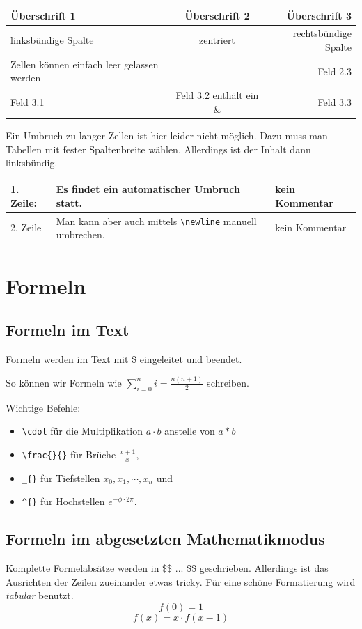 \documentclass[
	10pt,
	parskip=half-,		%
	paper=a4,			%
	english, ngerman		%
	]{scrartcl}			%
\begin{document}
\begin{tabular}[c]
	{|l|c|r|} %
	\hline %
	\textbf{Überschrift 1} & \textbf{Überschrift 2} & \textbf{Überschrift 3}\\
	\hline
	linksbündige Spalte & zentriert & rechtsbündige Spalte\\
	\hline
	Zellen können einfach leer gelassen werden &     & Feld 2.3\\
	\hline
	Feld 3.1 & Feld 3.2 enthält ein \&	& Feld 3.3\\%
	\hline
\end{tabular}

Ein Umbruch zu langer Zellen ist hier leider nicht möglich. Dazu muss man Tabellen mit fester Spaltenbreite wählen. Allerdings ist der Inhalt dann linksbündig.

\begin{tabular}{|l|p{5cm}|l|}
	\hline
	1. Zeile: & Es findet ein automatischer Umbruch statt. & kein Kommentar\\
	\hline
	2. Zeile & Man kann aber auch mittels \verb|\newline| manuell umbrechen. & kein Kommentar\\  
	\hline
\end{tabular}

\section{Formeln}

\subsection{Formeln im Text}
Formeln werden im Text mit \$ eingeleitet und beendet.

So können wir Formeln wie $ \sum_{i=0}^{n}i= \frac{n(n+1)}{2} $ schreiben.

Wichtige Befehle:
\begin{itemize}
	\item \verb|\cdot| für die Multiplikation $a\cdot b$ anstelle von $a*b$
	\item \verb|\frac{}{}| für Brüche $\frac{x+1}{x}$,
	\item \verb|_{}| für Tiefstellen $x_{0},x_{1},\cdots ,x_{n}$ und
	\item \verb|^{}| für Hochstellen $e^{-\phi\cdot 2\pi}$.
\end{itemize}

\subsection{Formeln im abgesetzten Mathematikmodus}
Komplette Formelabsätze werden in \$\$ ... \$\$ geschrieben. Allerdings ist das Ausrichten der Zeilen zueinander etwas tricky. Für eine schöne Formatierung wird \emph{tabular} benutzt.
$$ f(0) = 1 $$
$$ f(x) = x \cdot f(x-1) $$
\end{document}
